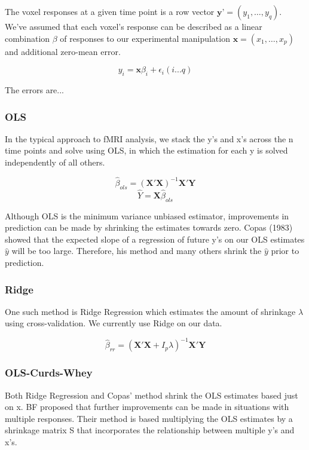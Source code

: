 \documentclass{article}
\begin{document}
The voxel responses at a given time point is a row vector $ \textbf{y'}
= (y_1, \dots ,y_q) $. We've assumed that each voxel's response can
be described as a linear combination $ \beta $ of responses to our
experimental manipulation $ \textbf{x}=(x_1, \dots ,x_p) $ and
additional zero-mean error.

\[ y_i = \textbf{x} \beta_i + \epsilon_i   (i...q)\]  


The errors are... 

\subsubsection{OLS}\label{ols}

In the typical approach to fMRI analysis, we stack the y's and x's
across the n time points and solve using OLS, in which the estimation
for each y is solved independently of all others.

\[ \hat \beta_{ols} =  (\textbf{X}'\textbf{X})^{-1} \textbf{X}' \textbf{Y} \]
\[ \hat Y = \textbf{X} \hat \beta_{ols} \]

Although OLS is the minimum variance unbiased estimator, improvements in
prediction can be made by shrinking the estimates towards zero. Copas
(1983) showed that the expected slope of a regression of future y's on
our OLS estimates $ \hat y $ will be too large. Therefore, his method
and many others shrink the $ \hat y $ prior to prediction.

\subsubsection{Ridge}\label{ridge}

One such method is Ridge Regression which estimates the amount of
shrinkage $ \lambda $ using cross-validation. We currently use Ridge
on our data.

\[ \hat \beta_{rr} =  (\textbf{X}'\textbf{X} + I_p \lambda )^{-1} \textbf{X}' \textbf{Y} \]

\subsubsection{OLS-Curds-Whey}\label{ols-curds-whey}

Both Ridge Regression and Copas' method shrink the OLS estimates based
just on x. BF proposed that further improvements can be made in
situations with multiple responses. Their method is based multiplying the
OLS estimates by a shrinkage matrix S that incorporates the relationship
between multiple y's and x's.
\end{document}
